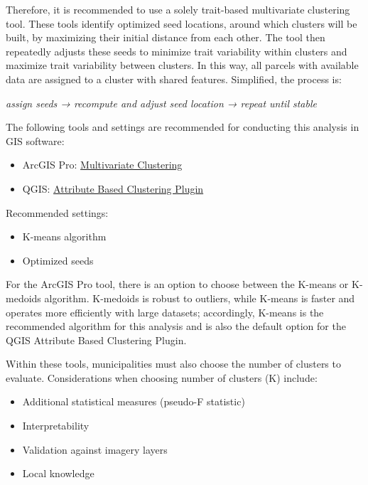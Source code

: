 \documentclass[
  letterpaper,
  DIV=11,
  numbers=noendperiod]{scrreprt}
\providecommand{\tightlist}{%
  \setlength{\itemsep}{0pt}\setlength{\parskip}{0pt}}
\begin{document}
\begin{enumerate}
  Therefore, it is recommended to use a solely trait-based multivariate
  clustering tool. These tools identify optimized seed locations, around
  which clusters will be built, by maximizing their initial distance
  from each other. The tool then repeatedly adjusts these seeds to
  minimize trait variability within clusters and maximize trait
  variability between clusters. In this way, all parcels with available
  data are assigned to a cluster with shared features. Simplified, the
  process is:

  \emph{assign seeds → recompute and adjust seed location → repeat until
  stable}

  The following tools and settings are recommended for conducting this
  analysis in GIS software:

  \begin{itemize}
  \tightlist
  \item
    ArcGIS Pro:
    \href{https://doc.esri.com/en/arcgis-pro/latest/tool-reference/spatial-statistics/multivariate-clustering.html?tabs=dialog}{Multivariate
    Clustering}
  \item
    QGIS:
    \href{https://knowyourspace.dk/2021/04/09/using-the-attribute-based-clustering-plugin-qgis/}{Attribute
    Based Clustering Plugin}
  \end{itemize}

  Recommended settings:

  \begin{itemize}
  \tightlist
  \item
    K-means algorithm
  \item
    Optimized seeds
  \end{itemize}

  For the ArcGIS Pro tool, there is an option to choose between the
  K-means or K-medoids algorithm. K-medoids is robust to outliers, while
  K-means is faster and operates more efficiently with large datasets;
  accordingly, K-means is the recommended algorithm for this analysis
  and is also the default option for the QGIS Attribute Based Clustering
  Plugin.

  Within these tools, municipalities must also choose the number of
  clusters to evaluate. Considerations when choosing number of clusters
  (K) include:

  \begin{itemize}
  \tightlist
  \item
    Additional statistical measures (pseudo-F statistic)
  \item
    Interpretability
  \item
    Validation against imagery layers
  \item
    Local knowledge
  \end{itemize}


\end{enumerate}
\end{document}
